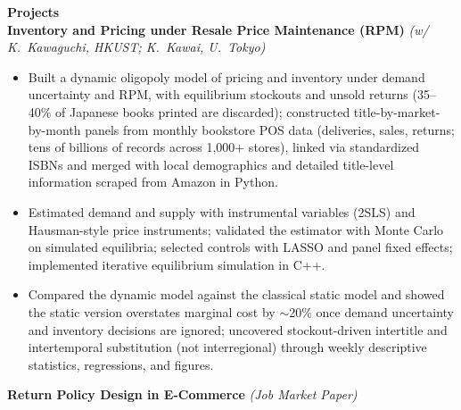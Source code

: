 \documentclass[11pt,letterpaper]{article}
\begin{document}
{\large \textbf{Projects}}\\[-0.5pt]
\textbf{Inventory and Pricing under Resale Price Maintenance (RPM)} \textit{(w/ K.\ Kawaguchi, HKUST; K.\ Kawai, U.\ Tokyo)}\\
\vspace{-6pt}
\begin{itemize}
  \item Built a dynamic oligopoly model of pricing and inventory under demand uncertainty and RPM, with equilibrium stockouts and unsold returns (35--40\% of Japanese books printed are discarded); constructed title-by-market-by-month panels from monthly bookstore POS data (deliveries, sales, returns; tens of billions of records across 1{,}000+ stores), linked via standardized ISBNs and merged with local demographics and detailed title-level information scraped from Amazon in Python.
  \item Estimated demand and supply with instrumental variables (2SLS) and Hausman-style price instruments; validated the estimator with Monte Carlo on simulated equilibria; selected controls with LASSO and panel fixed effects; implemented iterative equilibrium simulation in C++.
  \item Compared the dynamic model against the classical static model and showed the static version overstates marginal cost by \(\sim\)20\% once demand uncertainty and inventory decisions are ignored; uncovered stockout-driven intertitle and intertemporal substitution (not interregional) through weekly descriptive statistics, regressions, and figures.
\end{itemize}
\vspace{-3pt}
\textbf{Return Policy Design in E-Commerce} \textit{(Job Market Paper)}\\
\vspace{-6pt}
\end{document}
